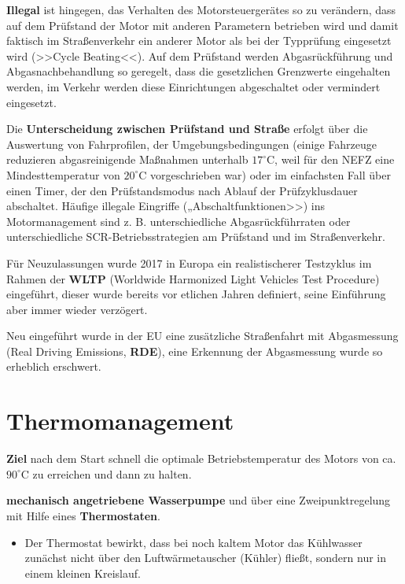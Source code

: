 \textbf{Illegal} ist hingegen, das Verhalten des Motorsteuergerätes so
zu verändern, dass auf dem Prüfstand der Motor mit anderen Parametern
betrieben wird und damit faktisch im Straßenverkehr ein anderer Motor
als bei der Typprüfung eingesetzt wird (>>Cycle Beating<<). Auf dem
Prüfstand werden Abgasrückführung und Abgasnachbehandlung so geregelt,
dass die gesetzlichen Grenzwerte eingehalten werden, im Verkehr werden
diese Einrichtungen abgeschaltet oder vermindert eingesetzt.

Die \textbf{Unterscheidung zwischen Prüfstand und Straße} erfolgt über
die Auswertung von Fahrprofilen, der Umgebungsbedingungen (einige
Fahrzeuge reduzieren abgasreinigende Maßnahmen unterhalb
$17^\circ \text{C}$, weil für den NEFZ eine Mindesttemperatur von
$20^\circ \text{C}$ vorgeschrieben war) oder im einfachsten Fall über
einen Timer, der den Prüfstandsmodus nach Ablauf der Prüfzyklusdauer
abschaltet. Häufige illegale Eingriffe („Abschaltfunktionen>>) ins
Motormanagement sind z. B. unterschiedliche Abgasrückführraten oder
unterschiedliche SCR-Betriebsstrategien am Prüfstand und im
Straßenverkehr.

Für Neuzulassungen wurde 2017 in Europa ein realistischerer Testzyklus
im Rahmen der \textbf{WLTP} (Worldwide Harmonized Light Vehicles Test
Procedure) eingeführt, dieser wurde bereits vor etlichen Jahren
definiert, seine Einführung aber immer wieder verzögert.

Neu eingeführt wurde in der EU eine zusätzliche Straßenfahrt mit
Abgasmessung (Real Driving Emissions, \textbf{RDE}), eine Erkennung der
Abgasmessung wurde so erheblich erschwert.

\newpage

\section{Thermomanagement}\label{thermomanagement}

\textbf{Ziel} nach dem Start schnell die optimale Betriebstemperatur des
Motors von ca. $90^\circ \text{C}$ zu erreichen und dann zu halten.

\textbf{mechanisch angetriebene Wasserpumpe} und über eine
Zweipunktregelung mit Hilfe eines \textbf{Thermostaten}.

\begin{itemize}
\item
  Der Thermostat bewirkt, dass bei noch kaltem Motor das Kühlwasser
  zunächst nicht über den Luftwärmetauscher (Kühler) fließt, sondern nur
  in einem kleinen Kreislauf.
\end{itemize}

